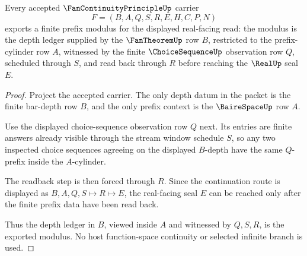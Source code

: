 \begin{theorem}
\label{thm:fan-continuity-principle-modulus-extraction}
Every accepted $\FanContinuityPrincipleUp$ carrier
$$
F=(B,A,Q,S,R,E,H,C,P,N)
$$
exports a finite prefix modulus for the displayed real-facing read: the modulus is the depth ledger supplied by the $\FanTheoremUp$ row $B$, restricted to the prefix-cylinder row $A$, witnessed by the finite $\ChoiceSequenceUp$ observation row $Q$, scheduled through $S$, and read back through $R$ before reaching the $\RealUp$ seal $E$.
\end{theorem}
\begin{proof}
Project the accepted carrier. The only depth datum in the packet is the finite bar-depth row $B$, and the only prefix context is the $\BaireSpaceUp$ row $A$.

Use the displayed choice-sequence observation row $Q$ next. Its entries are finite answers already visible through the stream window schedule $S$, so any two inspected choice sequences agreeing on the displayed $B$-depth have the same $Q$-prefix inside the $A$-cylinder.

The readback step is then forced through $R$. Since the continuation route is displayed as $B,A,Q,S \longmapsto R \longmapsto E$, the real-facing seal $E$ can be reached only after the finite prefix data have been read back.

Thus the depth ledger in $B$, viewed inside $A$ and witnessed by $Q,S,R$, is the exported modulus. No host function-space continuity or selected infinite branch is used.
\end{proof}

